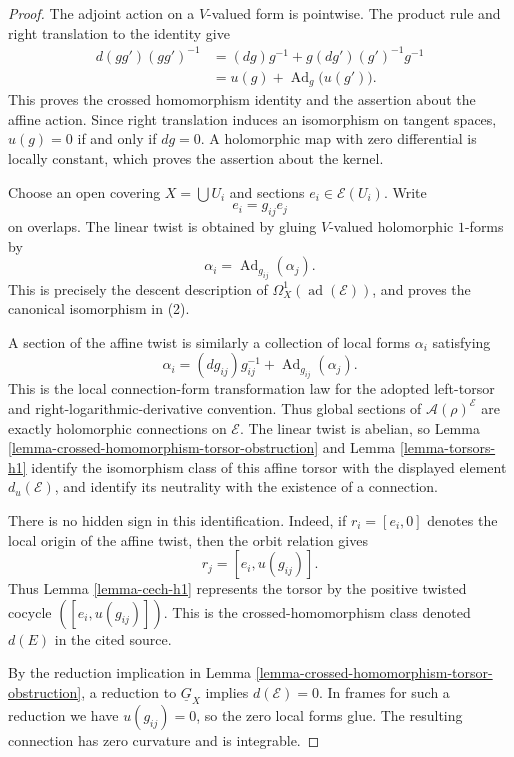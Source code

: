 \begin{proof}
The adjoint action on a $V$-valued form is pointwise. The product rule and
right translation to the identity give
\begin{align*}
d(gg')(gg')^{-1}
&=(dg)g^{-1}
+g(dg')(g')^{-1}g^{-1} \\
&=u(g)+\operatorname{Ad}_g\bigl(u(g')\bigr).
\end{align*}
This proves the crossed homomorphism identity and the assertion about the
affine action. Since right translation induces an isomorphism on tangent
spaces, $u(g)=0$ if and only if $dg=0$. A holomorphic map with zero
differential is locally constant, which proves the assertion about the
kernel.

Choose an open covering $X=\bigcup U_i$ and sections
$e_i\in\mathcal E(U_i)$. Write
$$
e_i=g_{ij}e_j
$$
on overlaps. The linear twist is obtained by gluing $V$-valued holomorphic
$1$-forms by
$$
\alpha_i=\operatorname{Ad}_{g_{ij}}(\alpha_j).
$$
This is precisely the descent description of
$\Omega_X^1(\operatorname{ad}(\mathcal E))$, and proves the canonical
isomorphism in (2).

A section of the affine twist is similarly a collection of local forms
$\alpha_i$ satisfying
$$
\alpha_i=(dg_{ij})g_{ij}^{-1}
+\operatorname{Ad}_{g_{ij}}(\alpha_j).
$$
This is the local connection-form transformation law for the adopted
left-torsor and right-logarithmic-derivative convention. Thus global sections
of $\mathcal A(\rho)^{\mathcal E}$ are exactly holomorphic connections on
$\mathcal E$. The linear twist is abelian, so
Lemma \ref{lemma-crossed-homomorphism-torsor-obstruction} and
Lemma \ref{lemma-torsors-h1} identify the isomorphism class of this affine
torsor with the displayed element $d_u(\mathcal E)$, and identify its
neutrality with the existence of a connection.

There is no hidden sign in this identification. Indeed, if
$r_i=[e_i,0]$ denotes the local origin of the affine twist, then the orbit
relation gives
$$
r_j=[e_i,u(g_{ij})].
$$
Thus Lemma \ref{lemma-cech-h1} represents the torsor by the positive twisted
cocycle $([e_i,u(g_{ij})])$. This is the crossed-homomorphism class denoted
$d(E)$ in the cited source.

By the reduction implication in
Lemma \ref{lemma-crossed-homomorphism-torsor-obstruction}, a reduction to
$\underline G_X$ implies $d(\mathcal E)=0$. In frames for such a reduction
we have $u(g_{ij})=0$, so the zero local forms glue. The resulting connection
has zero curvature and is integrable.


\end{proof}
